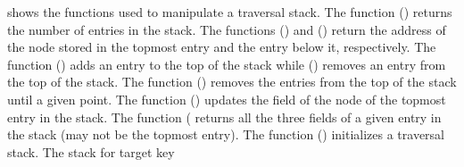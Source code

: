  shows the functions used to manipulate a traversal stack. The function \Size{} () returns the number of entries in the stack. The functions \GetTop{} () and \GetSecondToTop{} () return the address of the node stored in the topmost entry and the entry below it, respectively. The function \AddToTop{} () adds an entry to the top of the stack while \RemoveFromTop{} () removes an entry from the top of the stack. The function \RemoveUntilCritical{} () removes the entries from the top of the stack until a given point. The function \RememberCritical{} () updates the \myanchor{} field of the \myanchor{} node of the topmost entry in the stack. The function \GetFullEntry{} ( returns all the three fields of a given entry in the stack (may not be the topmost entry). The function \InitializeTraversalRecord{} () initializes a traversal stack. The stack for target key %

